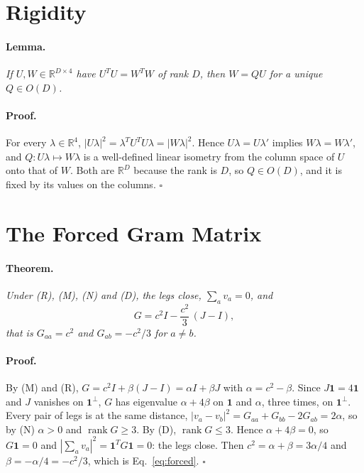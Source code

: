 \documentclass[twocolumn]{iopjournal}
\begin{document}
\section*{Rigidity}

\paragraph{Lemma.} \textit{If $U, W \in \mathbb{R}^{D \times 4}$
have $U^T U = W^T W$ of rank $D$, then $W = QU$ for a unique
$Q \in O(D)$.}

\paragraph{Proof.} For every $\lambda \in \mathbb{R}^4$,
$|U\lambda|^2 = \lambda^T U^T U \lambda = |W\lambda|^2$. Hence
$U\lambda = U\lambda'$ implies $W\lambda = W\lambda'$, and
$Q : U\lambda \mapsto W\lambda$ is a well-defined linear isometry
from the column space of $U$ onto that of $W$. Both are
$\mathbb{R}^D$ because the rank is $D$, so $Q \in O(D)$, and it is
fixed by its values on the columns. \hfill $\square$


\section*{The Forced Gram Matrix}

\paragraph{Theorem.} \textit{Under (R), (M), (N) and (D), the legs
close, $\sum_a v_a = 0$, and}
\begin{equation}
  \boxed{G = c^2 I - \frac{c^2}{3}\,(J - I),}
  \label{eq:forced}
\end{equation}
\textit{that is $G_{aa} = c^2$ and $G_{ab} = -c^2/3$ for
$a \neq b$.}

\paragraph{Proof.} By (M) and (R), $G = c^2 I + \beta(J - I)
= \alpha I + \beta J$ with $\alpha = c^2 - \beta$. Since
$J\mathbf{1} = 4\mathbf{1}$ and $J$ vanishes on
$\mathbf{1}^\perp$, $G$ has eigenvalue $\alpha + 4\beta$ on
$\mathbf{1}$ and $\alpha$, three times, on $\mathbf{1}^\perp$. Every
pair of legs is at the same distance,
$|v_a - v_b|^2 = G_{aa} + G_{bb} - 2G_{ab} = 2\alpha$, so by (N)
$\alpha > 0$ and $\operatorname{rank} G \ge 3$. By (D),
$\operatorname{rank} G \le 3$. Hence $\alpha + 4\beta = 0$, so
$G\mathbf{1} = 0$ and
$|\sum_a v_a|^2 = \mathbf{1}^T G \mathbf{1} = 0$: the legs close.
Then $c^2 = \alpha + \beta = 3\alpha/4$ and
$\beta = -\alpha/4 = -c^2/3$, which is Eq.~\eqref{eq:forced}.
\hfill $\square$
\end{document}
